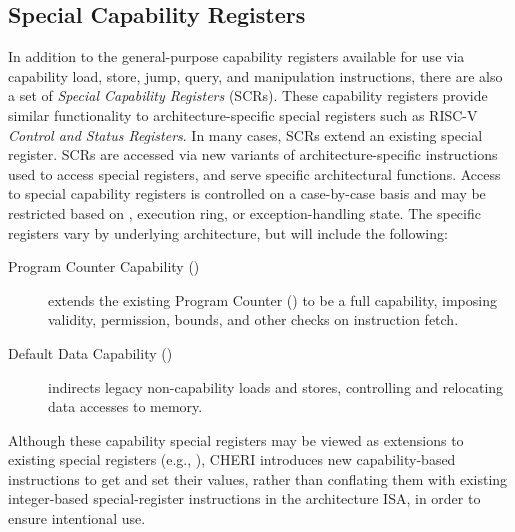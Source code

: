 \subsection{Special Capability Registers}
\label{section:special-capability-registers}

In addition to the general-purpose capability registers available for use via
capability load, store, jump, query, and manipulation instructions, there are
also a set of \textit{Special Capability Registers} (SCRs).
These capability registers provide similar functionality to
architecture-specific special registers such as RISC-V \textit{Control
  and Status Registers}.  In many cases, SCRs extend an existing
special register.
SCRs are accessed via new variants of architecture-specific
instructions used to access special registers, and serve specific
architectural functions.
Access to special capability registers is controlled on a case-by-case basis
and may be restricted based on \cappermASR, execution ring, or
exception-handling state.
The specific registers vary by underlying architecture, but will include the
following:

\begin{description}
\item[Program Counter Capability (\PCC{})] extends the existing Program
  Counter (\PC{}) to be a full capability, imposing validity, permission,
  bounds, and other checks on instruction fetch.

\item[Default Data Capability (\DDC{})] indirects legacy non-capability loads
  and stores, controlling and relocating data accesses to memory.
\end{description}

Although these capability special registers may be viewed as extensions to
existing special registers (e.g., \PC{}), CHERI introduces new
capability-based instructions to get and set their values, rather than
conflating them with existing integer-based special-register instructions in
the architecture ISA, in order to ensure intentional use.

